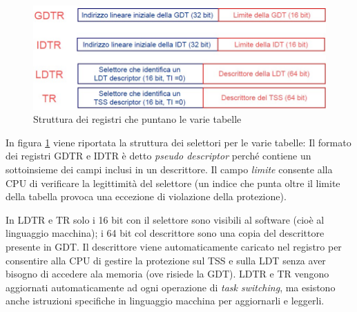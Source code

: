 \begin{figure}[!h]
\centering
\includegraphics[width=0.75\columnwidth]{img/selettori}
\caption{Struttura dei registri che puntano le varie tabelle}
\label{fig:selettori}
\end{figure}

In figura \ref{fig:selettori} viene riportata la struttura dei selettori per le varie tabelle:
Il formato dei registri GDTR e IDTR è detto \textit{pseudo descriptor} perché contiene un sottoinsieme dei campi inclusi in un descrittore. Il campo \textit{limite} consente alla CPU di verificare la legittimità del selettore (un indice che punta oltre il limite della tabella provoca una eccezione di violazione della protezione).

In LDTR e TR solo i 16 bit con il selettore sono visibili al software (cioè al linguaggio macchina); i 64 bit col descrittore sono una copia del descrittore presente in GDT. Il descrittore viene automaticamente caricato nel registro per consentire alla CPU di gestire la protezione sul TSS e sulla LDT senza aver bisogno di accedere ala
memoria (ove risiede la GDT). LDTR e TR vengono aggiornati automaticamente ad ogni operazione di \textit{task switching}, ma esistono anche istruzioni specifiche in linguaggio macchina per aggiornarli e leggerli.




